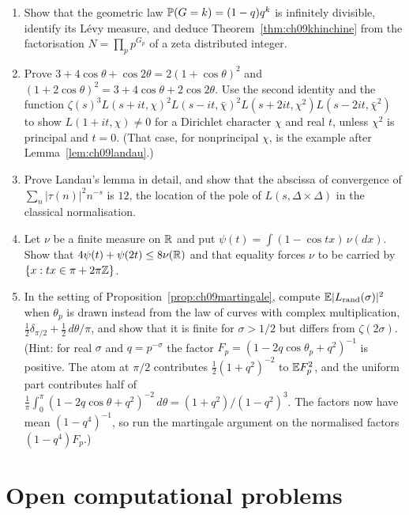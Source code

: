 \begin{enumerate}
\item\label{ex:ch09geometric} Show that the geometric law $\mathbb{P}(G=k) = (1-q)q^k$ is infinitely divisible, identify its L\'evy measure, and deduce Theorem~\ref{thm:ch09khinchine} from the factorisation $N = \prod_pp^{G_p}$ of a zeta distributed integer.
\item Prove $3+4\cos\theta+\cos2\theta = 2(1+\cos\theta)^2$ and $(1+2\cos\theta)^2 = 3+4\cos\theta+2\cos2\theta$. Use the second identity and the function $\zeta(s)^3L(s+it,\chi)^2L(s-it,\bar\chi)^2L(s+2it,\chi^2)L(s-2it,\bar\chi^2)$ to show $L(1+it,\chi)\ne0$ for a Dirichlet character $\chi$ and real $t$, unless $\chi^2$ is principal and $t=0$. (That case, for nonprincipal $\chi$, is the example after Lemma~\ref{lem:ch09landau}.)
\item Prove Landau's lemma in detail, and show that the abscissa of convergence of $\sum_n|\tau(n)|^2n^{-s}$ is $12$, the location of the pole of $L(s,\Delta\times\Delta)$ in the classical normalisation.
\item Let $\nu$ be a finite measure on $\mathbb{R}$ and put $\psi(t) = \int(1-\cos tx)\,\nu(dx)$. Show that $4\psi(t)+\psi(2t)\le 8\nu(\mathbb{R})$ and that equality forces $\nu$ to be carried by $\{x: tx\in\pi+2\pi\mathbb{Z}\}$.
\item In the setting of Proposition~\ref{prop:ch09martingale}, compute $\mathbb{E}|L_{\mathrm{rand}}(\sigma)|^2$ when $\theta_p$ is drawn instead from the law of curves with complex multiplication, $\frac12\delta_{\pi/2}+\frac12\,d\theta/\pi$, and show that it is finite for $\sigma>1/2$ but differs from $\zeta(2\sigma)$. (Hint: for real $\sigma$ and $q=p^{-\sigma}$ the factor $F_p=(1-2q\cos\theta_p+q^2)^{-1}$ is positive. The atom at $\pi/2$ contributes $\frac12(1+q^2)^{-2}$ to $\mathbb{E} F_p^2$, and the uniform part contributes half of $\frac1\pi\int_0^\pi(1-2q\cos\theta+q^2)^{-2}\,d\theta = (1+q^2)/(1-q^2)^3$. The factors now have mean $(1-q^4)^{-1}$, so run the martingale argument on the normalised factors $(1-q^4)F_p$.)
\end{enumerate}

\section{Open computational problems}

